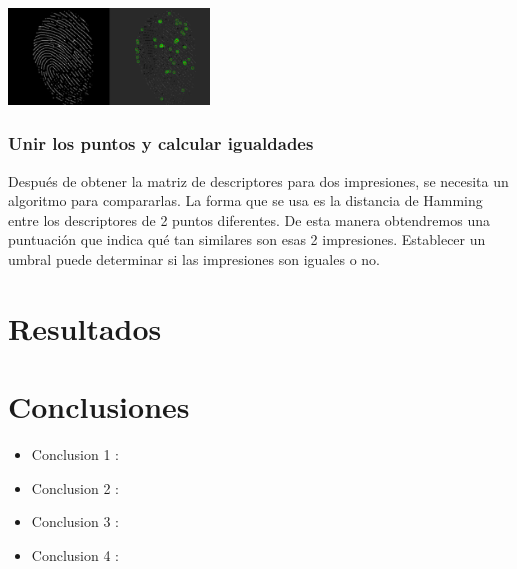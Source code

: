 \documentclass[preprint,12pt]{elsarticle}
\begin{document}
\begin{multicols}{2}
{\includegraphics[width=0.4\textwidth]{./IMAGENES/harris}\par}

	\subsubsection{Unir los puntos y calcular igualdades}
Después de obtener la matriz de descriptores para dos impresiones, se necesita un algoritmo para compararlas. La forma que se usa es la distancia de Hamming entre los descriptores de 2 puntos diferentes. De esta manera obtendremos una puntuación que indica qué tan similares son esas 2 impresiones. Establecer un umbral puede determinar si las impresiones son iguales o no.




\section{Resultados}

\cite{Gartner} 





\section{Conclusiones}

\begin{itemize}

\item Conclusion 1 : \\

\item Conclusion 2 : \\ 

\item Conclusion 3 : \\ 

\item Conclusion 4 : \\ 
\end{itemize}

\end{multicols}

	
	\newpage
	
		 
\end{document}
